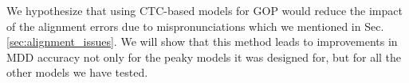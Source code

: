We hypothesize that using CTC-based models for GOP would reduce the impact of the alignment errors due to mispronunciations which we mentioned in Sec.\ref{sec:alignment_issues}.
We will show that this method leads to improvements in MDD accuracy not only for the peaky models it was designed for, but for all the other models we have tested.



